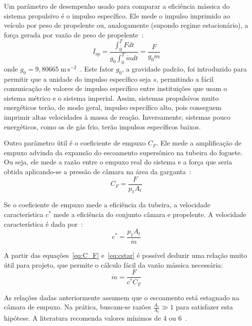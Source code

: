 Um parâmetro de desempenho usado para comparar a eficiência mássica do sistema propulsivo é o impulso específico. Ele mede o impulso imprimido ao veículo por peso de propelente ou, analogamente (supondo regime estacionário), a força gerada por vazão de peso de propelente~\cite{Sutton}:
\begin{equation}
    \label{eq:Isp}
    I_{\text{sp}} = \frac{\int^T_0 F dt}{g_0 \int^T_0 \dot{m}dt} = \frac{F}{g_0 \dot{m}}
\end{equation}
onde \(g_0=9,80665\;\mathrm{m}\,\mathrm{s}^{-2}\)~\cite{CGPM}. Este fator \(g_0\), a gravidade padrão, foi introduzido para permitir que a unidade do impulso específico seja \(s\), permitindo a fácil comunicação de valores de impulso específico entre instituições que usam o sistema métrico e o sistema imperial. Assim, sistemas propulsivos muito energéticos terão, de modo geral, impulso específico alto, pois conseguem imprimir altas velocidades à massa de reação. Inversamente, sistemas pouco energéticos, como os de gás frio, terão impulsos específicos baixos.

Outro parâmetro útil é o coeficiente de empuxo \(C_F\). Ele mede a amplificação de empuxo advinda da expansão do escoamento supersônico na tubeira do foguete. Ou seja, ele mede a razão entre o empuxo real do sistema e a força que seria obtida aplicando-se a pressão de câmara na área da garganta~\cite{Sutton}:
\begin{equation}
    \label{eq:C_F}
    C_F = \frac{F}{p_1 A_t}
\end{equation}

Se o coeficiente de empuxo mede a eficiência da tubeira, a velocidade característica \(c^*\) mede a eficiência do conjunto câmara e propelente. A velocidade característica é dada por~\cite{Sutton}:
\begin{equation}
    \label{eq:cstar}
    c^* = \frac{p_1 A_t}{\dot{m}}
\end{equation}

A partir das equações~\ref{eq:C_F} e~\ref{eq:cstar} é possível deduzir uma relação muito útil para projeto, que permite o cálculo fácil da vazão mássica necessária:
\begin{equation}
    \label{eq:mdot}
    \dot{m} = \frac{F}{c^* C_F}
\end{equation}

As relações dadas anteriormente assumem que o escoamento está estagnado na câmara de empuxo. Na prática, buscam-se razões \(\frac{A_c}{A_t} \gg 1\) para satisfazer esta hipótese. A literatura recomenda valores mínimos de 4 ou 6~\cite{Sutton}.

